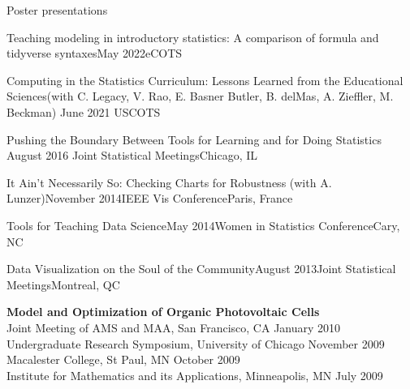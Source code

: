 \documentclass{resume} %
\begin{document}
\begin{rSection}{Poster presentations}

\begin{sSubsection}{
Teaching modeling in introductory statistics: A comparison of formula and tidyverse syntaxes}{}{May 2022}{eCOTS}{}
\end{sSubsection}

\begin{sSubsection}{Computing in the Statistics Curriculum: Lessons Learned from the Educational Sciences}{}{(with C. Legacy, V. Rao, E. Basner Butler, B. delMas, A. Zieffler, M. Beckman) \hfill June 2021 }{USCOTS}{}
\end{sSubsection}

\begin{sSubsection}{Pushing the Boundary Between Tools for Learning and for Doing Statistics}{ }{August 2016 }{Joint Statistical Meetings}{Chicago, IL}
\end{sSubsection}

\begin{sSubsection}{It Ain't Necessarily So: Checking Charts for Robustness}{ (with A. Lunzer)}{November 2014}{IEEE Vis Conference}{Paris, France}
\end{sSubsection}

\begin{sSubsection}{Tools for Teaching Data Science}{}{May 2014}{Women in Statistics Conference}{Cary, NC}
\end{sSubsection}

\begin{sSubsection}{Data Visualization on the Soul of the Community}{}{August 2013}{Joint Statistical Meetings}{Montreal, QC}
\end{sSubsection}


{\bf Model and Optimization of Organic Photovoltaic Cells} \hfill \\ 
Joint Meeting of AMS and MAA, San Francisco, CA  \hfill January 2010 \\
Undergraduate Research Symposium, University of Chicago \hfill November 2009 \\
Macalester College, St Paul, MN \hfill  October 2009 \\ 
Institute for Mathematics and its Applications, Minneapolis, MN \hfill July 2009 \\
\end{rSection}
\end{document}
